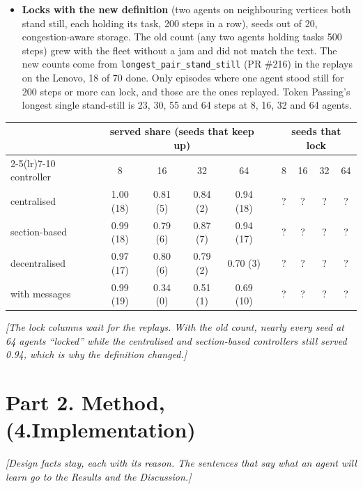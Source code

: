 \documentclass[11pt,a4paper]{article}
\newcommand{\note}[1]{{\small\itshape [#1]}}
\newcommand{\lab}[1]{\textsf{\footnotesize\detokenize{#1}}}
\begin{document}
\begin{itemize}[nosep]
    reach their goals. Their limitation: deadlocks when two robots enter one
    corridor from opposite ends, ``like prioritizing one robot's passage''.
  \item \textbf{Locks with the new definition} (two agents on neighbouring
    vertices both stand still, each holding its task, 200 steps in a row),
    seeds out of 20, congestion-aware storage. The old count (any two agents
    holding tasks 500 steps) grew with the fleet without a jam and did not
    match the text. The new counts come from \texttt{longest\_pair\_stand\_still}
    (PR \#216) in the replays on the Lenovo, 18 of 70 done. Only episodes
    where one agent stood still for 200 steps or more can lock, and those are
    the ones replayed. Token Passing's longest single stand-still is 23, 30,
    55 and 64 steps at 8, 16, 32 and 64 agents.
\end{itemize}

\begin{center}\small
\begin{tabular}{l cccc c cccc}
\toprule
& \multicolumn{4}{c}{served share (seeds that keep up)} && \multicolumn{4}{c}{seeds that lock} \\
\cmidrule(lr){2-5}\cmidrule(lr){7-10}
controller & 8 & 16 & 32 & 64 && 8 & 16 & 32 & 64 \\
\midrule
centralised   & 1.00 (18) & 0.81 (5) & 0.84 (2) & 0.94 (18) && ? & ? & ? & ? \\
section-based & 0.99 (18) & 0.79 (6) & 0.87 (7) & 0.94 (17) && ? & ? & ? & ? \\
decentralised & 0.97 (17) & 0.80 (6) & 0.79 (2) & 0.70 (3) && ? & ? & ? & ? \\
with messages & 0.99 (19) & 0.34 (0) & 0.51 (1) & 0.69 (10) && ? & ? & ? & ? \\
\bottomrule
\end{tabular}
\end{center}
\note{The lock columns wait for the replays. With the old count, nearly every
seed at 64 agents ``locked'' while the centralised and section-based
controllers still served 0.94, which is why the definition changed.}

\section*{Part 2. Method, \lab{sec:method:resolution} (4.Implementation)}
\note{Design facts stay, each with its reason. The sentences that say what an
agent will learn go to the Results and the Discussion.}
\end{document}
